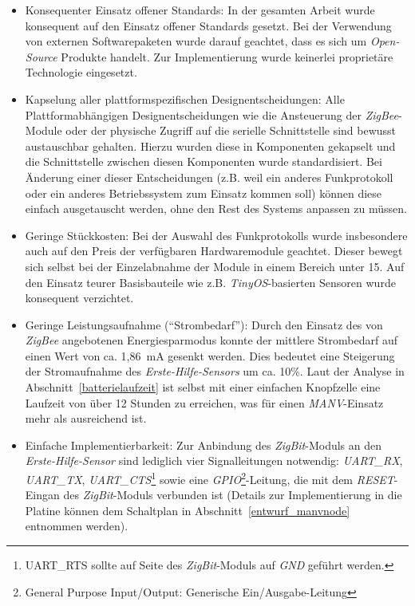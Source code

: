 \begin{itemize}
    \item{Konsequenter Einsatz offener Standards:} In der gesamten Arbeit wurde konsequent auf den
          Einsatz offener Standards gesetzt. Bei der Verwendung von externen Softwarepaketen wurde
          darauf geachtet, dass es sich um \emph{Open-Source} Produkte handelt. Zur Implementierung
          wurde keinerlei proprietäre Technologie eingesetzt.

    \item{Kapselung aller plattformspezifischen Designentscheidungen:} Alle Plattformabhängigen
          Designentscheidungen wie die Ansteuerung der \emph{ZigBee}-Module oder der
          physische Zugriff auf die serielle Schnittstelle sind bewusst austauschbar gehalten.
          Hierzu wurden diese in Komponenten gekapselt und die Schnittstelle zwischen diesen
          Komponenten wurde standardisiert. Bei Änderung einer dieser Entscheidungen (z.B.
          weil ein anderes Funkprotokoll oder ein anderes Betriebssystem zum Einsatz kommen soll)
          können diese einfach ausgetauscht werden, ohne den Rest des Systems anpassen zu 
          müssen.

    \item{Geringe Stückkosten:} Bei der Auswahl des Funkprotokolls wurde insbesondere auch auf den
          Preis der verfügbaren Hardwaremodule geachtet. Dieser bewegt sich selbst bei der
          Einzelabnahme der Module in einem Bereich unter 15\EUR{}. Auf den Einsatz teurer
          Basisbauteile wie z.B. \emph{TinyOS}-basierten Sensoren wurde konsequent verzichtet.

    \item{Geringe Leistungsaufnahme ("`Strombedarf"'):} Durch den Einsatz des von \emph{ZigBee}
          angebotenen Energiesparmodus konnte der mittlere Strombedarf auf einen Wert von ca. 
          1,86~mA gesenkt werden. Dies bedeutet eine Steigerung der Stromaufnahme des 
          \emph{Erste-Hilfe-Sensors} um ca. 10\%. 
          Laut der Analyse in Abschnitt~\ref{batterielaufzeit} ist selbst mit einer einfachen Knopfzelle
          eine Laufzeit von über 12 Stunden zu erreichen, was für einen \emph{MANV}-Einsatz mehr als
          ausreichend ist.

    \item{Einfache Implementierbarkeit:} Zur Anbindung des \emph{ZigBit}-Moduls an den \emph{Erste-Hilfe-Sensor}
          sind lediglich vier Signalleitungen notwendig: \emph{UART\_RX}, \emph{UART\_TX}, 
          \emph{UART\_CTS}\footnote{UART\_RTS sollte auf Seite des \emph{ZigBit}-Moduls auf \emph{GND}
              geführt werden.} sowie eine \emph{GPIO}\footnote{General Purpose Input/Output: 
              Generische Ein/Ausgabe-Leitung}-Leitung, 
              die mit dem \emph{RESET}-Eingan des
          \emph{ZigBit}-Moduls verbunden ist (Details zur Implementierung in die Platine können dem
          Schaltplan in Abschnitt~\ref{entwurf_manvnode} entnommen werden). 


\end{itemize}
